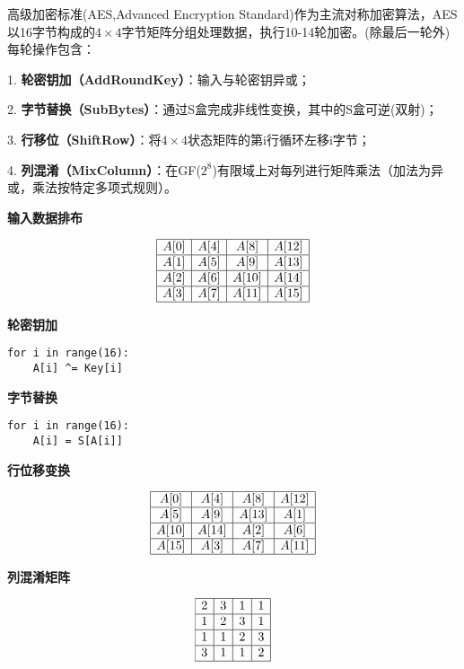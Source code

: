 
高级加密标准(AES,Advanced Encryption Standard)作为主流对称加密算法，AES以16字节构成的$4\times 4$字节矩阵分组处理数据，执行10-14轮加密。(除最后一轮外)每轮操作包含：

1. \textbf{轮密钥加（AddRoundKey）}：输入与轮密钥异或；

2. \textbf{字节替换（SubBytes）}：通过S盒完成非线性变换，其中的S盒可逆(双射)；

3. \textbf{行移位（ShiftRow）}：将$4\times 4$状态矩阵的第i行循环左移i字节；

4. \textbf{列混淆（MixColumn）}：在GF($2^8$)有限域上对每列进行矩阵乘法（加法为异或，乘法按特定多项式规则）。

\textbf{输入数据排布}

$$
\begin{array}{|c|c|c|c|}
\hline
A[0] & A[4] & A[8]  & A[12] \\
\hline
A[1] & A[5] & A[9]  & A[13] \\
\hline
A[2] & A[6] & A[10] & A[14] \\
\hline
A[3] & A[7] & A[11] & A[15] \\
\hline
\end{array}
$$

\textbf{轮密钥加}

\begin{verbatim}
for i in range(16):
    A[i] ^= Key[i]
\end{verbatim}

\textbf{字节替换}

\begin{verbatim}
for i in range(16):
    A[i] = S[A[i]]
\end{verbatim}

\textbf{行位移变换}

$$
\begin{array}{|c|c|c|c|}
\hline
A[0] & A[4] & A[8]  & A[12] \\
\hline
A[5] & A[9] & A[13]  & A[1] \\
\hline
A[10] & A[14] & A[2] & A[6] \\
\hline
A[15] & A[3] & A[7] & A[11] \\
\hline
\end{array}
$$

\textbf{列混淆矩阵}

$$
\begin{array}{|c|c|c|c|}
\hline
2 & 3 & 1 & 1 \\
\hline
1 & 2 & 3 & 1 \\
\hline
1 & 1 & 2 & 3 \\
\hline
3 & 1 & 1 & 2 \\
\hline
\end{array}
$$

